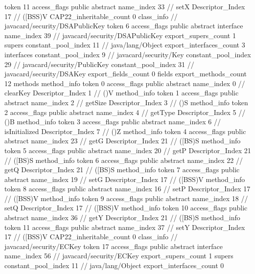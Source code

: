 {{{{{					token	11
					access_flags	public abstract
					name_index	33		// setX
					Descriptor_Index	17		// ([BSS)V
				}
			}
			CAP22_inheritable_count	0
		}
		class_info {		// javacard/security/DSAPublicKey
			token	6
			access_flags	public abstract interface
			name_index	39		// javacard/security/DSAPublicKey
			export_supers_count	1
			supers {
				constant_pool_index	11		// java/lang/Object
			}
			export_interfaces_count	3
			interfaces {
				constant_pool_index	9		// javacard/security/Key
				constant_pool_index	29		// javacard/security/PublicKey
				constant_pool_index	31		// javacard/security/DSAKey
			}
			export_fields_count	0
			fields {
			}
			export_methods_count	12
			methods {
				method_info {
					token	0
					access_flags	public abstract
					name_index	0		// clearKey
					Descriptor_Index	1		// ()V
				}
				method_info {
					token	1
					access_flags	public abstract
					name_index	2		// getSize
					Descriptor_Index	3		// ()S
				}
				method_info {
					token	2
					access_flags	public abstract
					name_index	4		// getType
					Descriptor_Index	5		// ()B
				}
				method_info {
					token	3
					access_flags	public abstract
					name_index	6		// isInitialized
					Descriptor_Index	7		// ()Z
				}
				method_info {
					token	4
					access_flags	public abstract
					name_index	23		// getG
					Descriptor_Index	21		// ([BS)S
				}
				method_info {
					token	5
					access_flags	public abstract
					name_index	20		// getP
					Descriptor_Index	21		// ([BS)S
				}
				method_info {
					token	6
					access_flags	public abstract
					name_index	22		// getQ
					Descriptor_Index	21		// ([BS)S
				}
				method_info {
					token	7
					access_flags	public abstract
					name_index	19		// setG
					Descriptor_Index	17		// ([BSS)V
				}
				method_info {
					token	8
					access_flags	public abstract
					name_index	16		// setP
					Descriptor_Index	17		// ([BSS)V
				}
				method_info {
					token	9
					access_flags	public abstract
					name_index	18		// setQ
					Descriptor_Index	17		// ([BSS)V
				}
				method_info {
					token	10
					access_flags	public abstract
					name_index	36		// getY
					Descriptor_Index	21		// ([BS)S
				}
				method_info {
					token	11
					access_flags	public abstract
					name_index	37		// setY
					Descriptor_Index	17		// ([BSS)V
				}
			}
			CAP22_inheritable_count	0
		}
		class_info {		// javacard/security/ECKey
			token	17
			access_flags	public abstract interface
			name_index	56		// javacard/security/ECKey
			export_supers_count	1
			supers {
				constant_pool_index	11		// java/lang/Object
			}
			export_interfaces_count	0
}}}
